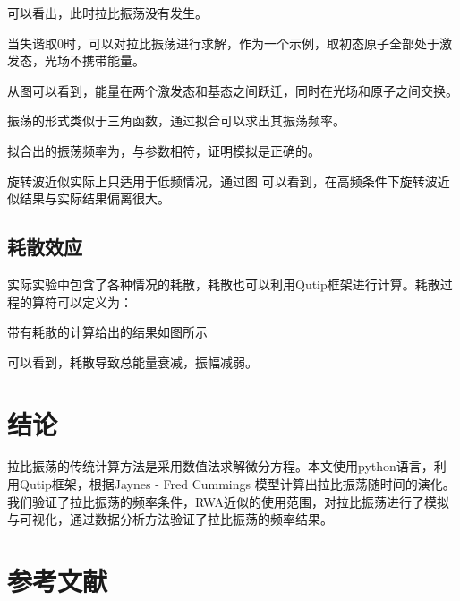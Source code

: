 \documentclass{ctexart}
\begin{document}
可以看出，此时拉比振荡没有发生。

当失谐取0时，可以对拉比振荡进行求解，作为一个示例，取初态原子全部处于激发态，光场不携带能量。

从图可以看到，能量在两个激发态和基态之间跃迁，同时在光场和原子之间交换。

振荡的形式类似于三角函数，通过拟合可以求出其振荡频率。

拟合出的振荡频率为，与参数相符，证明模拟是正确的。

旋转波近似实际上只适用于低频情况，通过图 可以看到，在高频条件下旋转波近似结果与实际结果偏离很大。
\subsection{耗散效应}
实际实验中包含了各种情况的耗散，耗散也可以利用Qutip框架进行计算。耗散过程的算符可以定义为：

带有耗散的计算给出的结果如图所示

可以看到，耗散导致总能量衰减，振幅减弱。
\section{结论}
拉比振荡的传统计算方法是采用数值法求解微分方程。本文使用python语言，利用Qutip框架，根据Jaynes - Fred Cummings 模型计算出拉比振荡随时间的演化。
我们验证了拉比振荡的频率条件，RWA近似的使用范围，对拉比振荡进行了模拟与可视化，通过数据分析方法验证了拉比振荡的频率结果。
\section{参考文献}
\printbibliography[heading=none]
\end{document}
